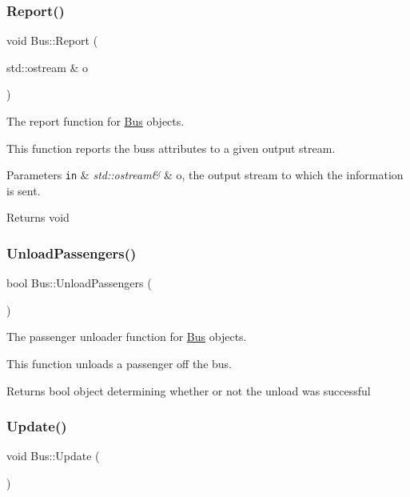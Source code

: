 \subsubsection{\texorpdfstring{Report()}{Report()}}
{\footnotesize\ttfamily void Bus\+::\+Report (\begin{DoxyParamCaption}\item[{std\+::ostream \&}]{o }\end{DoxyParamCaption})}



The report function for \hyperlink{classBus}{Bus} objects. 

This function reports the bus\textquotesingle{}s attributes to a given output stream.


\begin{DoxyParams}[1]{Parameters}
\mbox{\tt in}  & {\em std\+::ostream\&} & o, the output stream to which the information is sent.\\
\hline
\end{DoxyParams}
\begin{DoxyReturn}{Returns}
void 
\end{DoxyReturn}
\mbox{\label{classBus_a352bd5f926705ed4dd91d7fdea6a7fc9}} 
\subsubsection{\texorpdfstring{Unload\+Passengers()}{UnloadPassengers()}}
{\footnotesize\ttfamily bool Bus\+::\+Unload\+Passengers (\begin{DoxyParamCaption}{ }\end{DoxyParamCaption})}



The passenger unloader function for \hyperlink{classBus}{Bus} objects. 

This function unloads a passenger off the bus.

\begin{DoxyReturn}{Returns}
bool object determining whether or not the unload was successful 
\end{DoxyReturn}
\mbox{\label{classBus_a9896f74f16966f7621d0dfafff0ec6b4}} 
\subsubsection{\texorpdfstring{Update()}{Update()}}
{\footnotesize\ttfamily void Bus\+::\+Update (\begin{DoxyParamCaption}{ }\end{DoxyParamCaption})}



